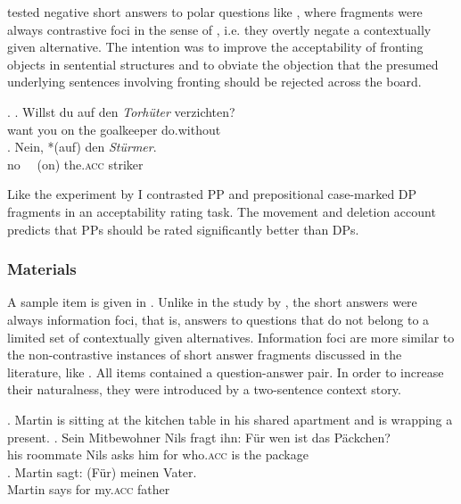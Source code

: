 \citet{merchant.etal2013} tested negative short answers to polar questions like \Next \citep[34]{merchant.etal2013}, where fragments were always contrastive foci in the sense of \citet{krifka2007}, i.e. they overtly negate a contextually given alternative. The intention was to improve the acceptability of fronting objects in sentential structures and to obviate the objection that the presumed underlying sentences involving fronting should be rejected across the board.

\ex. \ag. Willst du  auf den \textit{Torhüter} verzichten?\\
want you on the goalkeeper do.without\\
\bg. Nein,  *(auf) den \textit{Stürmer}.\\
no \mbox{~~}(on) the.\textsc{acc} striker\\
\hfill 

Like the experiment by \citet{merchant.etal2013} I contrasted PP and prepositional case-marked DP fragments in an acceptability rating task. The movement and deletion account predicts that PPs should be rated significantly better than DPs.

\subsubsection{Materials}
\label{sec:pstranding-german-materials}
A sample item is given in \Next. Unlike in the study by \citet{merchant.etal2013}, the short answers were always information foci, that is, answers to questions that do not belong to a limited set of contextually given alternatives. Information foci are more similar to the non-contrastive instances of short answer fragments discussed in the literature, like \LLast. All items contained a question-answer pair. In order to increase their naturalness, they were introduced by a two-sentence context story.

\ex. Martin is sitting at the kitchen table in his shared apartment and is wrapping a present. \label{ex:pstranding-ger-omission-ex}
\ag. Sein Mitbewohner Nils fragt ihn: Für wen ist das Päckchen?\\
     his roommate Nils asks him for who.\textsc{acc} is the package\\
\bg. Martin sagt: (Für) meinen Vater.\\
     Martin says for my.\textsc{acc} father\\
     
